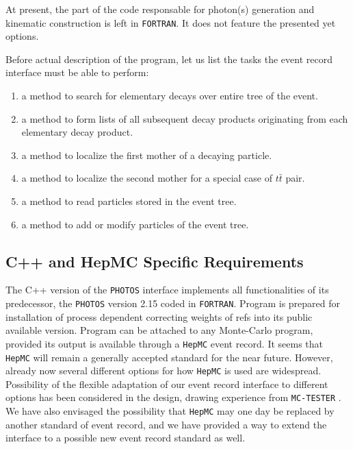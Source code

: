 \documentclass[]{Photos_interface_design}
\begin{document}
At present, the part of the code responsable for photon(s) generation and kinematic 
construction is left in  {\tt FORTRAN}. It does not feature the presented yet options.


Before actual description of the program, let us list the tasks the event record interface must be able to perform:
\begin{enumerate}
\item a method to search for elementary decays over entire tree of the event.
\item a method to form lists of all subsequent decay products originating from each elementary decay product.
\item a method to localize the first mother of a decaying particle. 
\item a method to localize the second mother for a special case of $t \bar t$ pair.
\item a method to read  particles stored in the event tree.
\item a method to add or modify particles of the event tree.
\end{enumerate}


\subsection{C++ and HepMC Specific Requirements}

The C++ version of the {\tt PHOTOS} interface implements all functionalities
of its predecessor, the {\tt PHOTOS} version 2.15 \cite{Golonka:2005pn} coded in {\tt FORTRAN}.
Program is prepared for installation of process dependent correcting weights of refs 
\cite{Golonka:2006tw,Nanava:2009vg} into its public available version. 
Program can be attached to any Monte-Carlo program,
provided its output is available through a {\tt HepMC} \cite{Dobbs:2001ck} event record.
It seems that {\tt HepMC} will
remain a generally accepted standard for the near future. However,
already now several different options for how {\tt HepMC} is used are
widespread. Possibility of the flexible  adaptation of our event record 
interface to different
options has been considered in the design,  drawing experience
from {\tt MC-TESTER} \cite{Golonka:2002rz,Davidson:2008ma}.
We have also
envisaged the possibility that {\tt HepMC} may one day be replaced by another
standard of event record, and we have provided a way to extend
the interface to a possible new event record standard as well.
\end{document}

